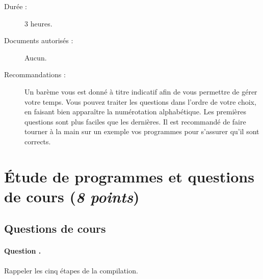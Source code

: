 
\setcounter{questioncount}{0}
\newcommand{\question}{\addtocounter{questioncount}{1}\paragraph{Question \Alph{questioncount}.}}
\newcommand{\commentaire}[1]{}
\newcommand{\pt}[1]{\fbox{$#1 \operatorname{pt}$}}

\vspace{-1cm}
\begin{description}
\item[Durée :] 3 heures.
\item[Documents autorisés :] Aucun.
\item[Recommandations :] Un barème vous est donné à titre indicatif
  afin de vous permettre de gérer votre temps. Vous pouvez traiter les
  questions dans l'ordre de votre choix, en faisant bien apparaître la
  numérotation alphabétique. Les premières questions sont plus faciles que les
  dernières.  Il est recommandé de faire tourner à la main sur un exemple
  vos programmes pour s'assurer qu'il sont corrects.
\end{description}

\setlength{\textfloatsep}{1em}

\section{Étude de programmes et questions de cours (\emph{8 points})}

\subsection{Questions de cours}
\question Rappeler les cinq étapes de la compilation. 


